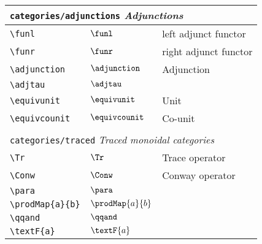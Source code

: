 \begin{longtable}{lll}
  \multicolumn{3}{l}{{\color[rgb]{0.5,0.5,0.5}\texttt{categories/adjunctions}} \emph{Adjunctions}}
  \\
  \hline
  {\color[rgb]{0.5,0.5,0.5}\texttt{\textbackslash funl}}                                                    & $\funl$                    & left adjunct functor\\
  {\color[rgb]{0.5,0.5,0.5}\texttt{\textbackslash funr}}                                                    & $\funr$                    & right adjunct functor\\
  {\color[rgb]{0.5,0.5,0.5}\texttt{\textbackslash adjunction}}                                              & $\adjunction$              & Adjunction\\
  {\color[rgb]{0.5,0.5,0.5}\texttt{\textbackslash adjtau}}                                                  & $\adjtau$                  & \\
  {\color[rgb]{0.5,0.5,0.5}\texttt{\textbackslash equivunit}}                                               & $\equivunit$               & Unit\\
  {\color[rgb]{0.5,0.5,0.5}\texttt{\textbackslash equivcounit}}                                             & $\equivcounit$             & Co-unit                                                 \\
  &                            &                                                         \\
  \multicolumn{3}{l}{{\color[rgb]{0.5,0.5,0.5}\texttt{categories/traced}} \emph{Traced monoidal categories}}
  \\
  \hline
  {\color[rgb]{0.5,0.5,0.5}\texttt{\textbackslash Tr}}                                                      & $\Tr$                      & Trace operator\\
  {\color[rgb]{0.5,0.5,0.5}\texttt{\textbackslash Conw}}                                                    & $\Conw$                    & Conway operator\\
  {\color[rgb]{0.5,0.5,0.5}\texttt{\textbackslash para}}                                                    & $\para$                    & \\
  {\color[rgb]{0.5,0.5,0.5}\texttt{\textbackslash prodMap\{a\}\{b\}}}                                       & $\prodMap{a}{b}$
  & \\
  {\color[rgb]{0.5,0.5,0.5}\texttt{\textbackslash qqand}}                                                   & $\qqand$                   & \\
  {\color[rgb]{0.5,0.5,0.5}\texttt{\textbackslash textF\{a\}}}                                              & $\textF{a}$                & \\

\end{longtable}
